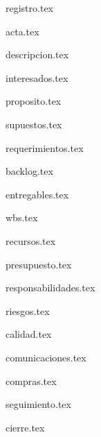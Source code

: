 \documentclass[11pt]{proyecto}
\begin{document}
\maketitle
\thispagestyle{empty}
\pagebreak


\thispagestyle{empty}
{\setlength{\parskip}{0pt}
\tableofcontents{}
}
\pagebreak

{registro.tex}

{acta.tex}

{descripcion.tex}

{interesados.tex}

{proposito.tex}

{supuestos.tex}

{requerimientos.tex}

{backlog.tex}

{entregables.tex}

{wbs.tex}

{recursos.tex}

{presupuesto.tex}
 
{responsabilidades.tex}

{riesgos.tex}

{calidad.tex}

{comunicaciones.tex}

{compras.tex}

{seguimiento.tex}

{cierre.tex}
\end{document}
